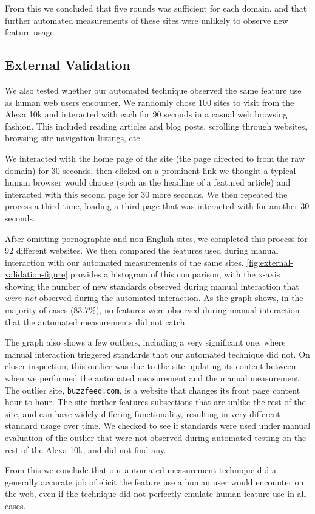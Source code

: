 From this we concluded that five rounds was sufficient for
each domain, and that further automated measurements of these sites were
unlikely to observe new feature usage.


\subsection{External Validation}
\label{measurement:validity:external-validation}



We also tested whether our automated technique observed the same feature
use as human web users encounter.   We randomly chose 100 sites to visit
from the Alexa 10k and interacted with each for 90 seconds in a casual
web browsing fashion.  This included reading articles and blog posts, scrolling
through websites, browsing site navigation listings, etc.

We interacted with
the home page of the site (the page directed to from the raw domain) for 30
seconds, then clicked on a prominent link we thought a typical human browser
would choose (such as the headline of a featured article) and interacted
with this second page for 30 more seconds.  We then repeated the process a
third time, loading a third page that was interacted with for another 30
seconds.

After omitting  pornographic and non-English sites, we completed this process
for 92 different websites. We then compared the features used during manual
interaction with our automated measurements of the same sites.
\ref{fig:external-validation-figure} provides a histogram of this
comparison, with the x-axis showing the number of new standards
observed during manual interaction that \textit{were not} observed during
the automated interaction.  As the graph shows, in the majority of cases
(83.7\%), no features were observed during manual interaction that the
automated measurements did not catch.

The graph also shows a few outliers,
including a very significant one, where manual interaction triggered
standards that our automated technique did not.  On closer inspection, this
outlier was due to the site updating its content between when we performed the
automated measurement and the manual measurement.  The outlier site,
\texttt{buzzfeed.com}, is a website that changes its front page
content hour to hour.  The site further features subsections that are unlike
the rest of the site, and can have widely differing functionality,
resulting in very different standard usage over time. We checked to see if
standards were used under manual evaluation of the outlier that were not observed
during automated testing on the rest of the Alexa 10k, and did not find any.

From this we conclude that our automated measurement technique did a generally
accurate job of elicit the feature use a human user would
encounter on the web, even if the technique did not perfectly emulate human
feature use in all cases.

